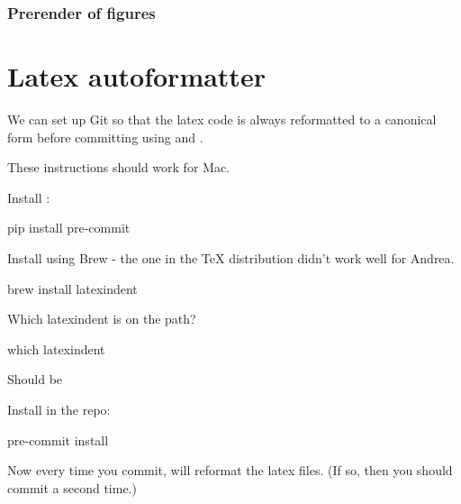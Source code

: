 \subsubsection{Prerender of figures}


\section{Latex autoformatter}

We can set up Git so that the latex code is always reformatted to a canonical form before committing using  and .

These instructions should work for Mac.

Install :
%
\begin{console}
    pip install pre-commit
\end{console}
%

Install  using Brew - the one in the TeX distribution didn't work well for Andrea.
%
\begin{console}
    brew install latexindent
\end{console}
%
Which latexindent is on the path?
%
\begin{console}
    which latexindent
\end{console}
%
Should be 

Install  in the repo:
%
\begin{console}
    pre-commit install
\end{console}
%
Now every time you commit,  will reformat the latex files.
(If so, then you should commit a second time.)
